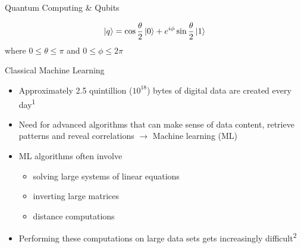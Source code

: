 \documentclass[10pt]{beamer}
\begin{document}
{\begin{frame}[fragile]{Quantum Computing \& Qubits}
\begin{minipage}[c][][b]{.5\textwidth}
\begin{equation}
\label{equ: blochqubit}
\ket{q} = \cos\frac{\theta}{2} \ket{0} + e^{i \phi} \sin\frac{\theta}{2} \ket{1}
\end{equation}
where $0 \leq \theta \leq \pi$ and $0 \leq \phi \leq 2\pi$
\null
\par\xdef\tpd{\the\prevdepth}
\end{minipage}


\end{frame}
}

{
\begin{frame}[fragile]{Classical Machine Learning}
   
\begin{itemize}
	\item Approximately 2.5 quintillion (${10}^{18}$) bytes of digital data are created every day\textsuperscript{1}
	\item Need for advanced algorithms that can make sense of data content, retrieve patterns and reveal correlations $\rightarrow$ Machine learning (ML) 
	\item ML algorithms often involve
	\begin{itemize}
	\item solving large systems of linear equations
	\item inverting large matrices
	\item distance computations
	\end{itemize}
	\item Performing these computations on large data
sets gets increasingly difficult\textsuperscript{2}


\end{itemize}

\end{frame}
}
\end{document}
